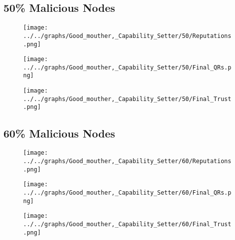 \begin{minipage}[t]{0.49\columnwidth}
\subsection*{50\% Malicious Nodes}
    \begin{figure}[H]
        \centering
        \texttt{[image: ../../graphs/Good\_mouther,\_Capability\_Setter/50/Reputations.png]}
    \end{figure}
    \begin{figure}[H]
        \centering
        \texttt{[image: ../../graphs/Good\_mouther,\_Capability\_Setter/50/Final\_QRs.png]}
    \end{figure}
\end{minipage}
\begin{minipage}[t]{0.49\columnwidth}
    \begin{figure}[H]
        \centering
        \texttt{[image: ../../graphs/Good\_mouther,\_Capability\_Setter/50/Final\_Trust.png]}
    \end{figure}
\end{minipage}

\begin{minipage}[t]{0.49\columnwidth}
\subsection*{60\% Malicious Nodes}
    \begin{figure}[H]
        \centering
        \texttt{[image: ../../graphs/Good\_mouther,\_Capability\_Setter/60/Reputations.png]}
    \end{figure}
    \begin{figure}[H]
        \centering
        \texttt{[image: ../../graphs/Good\_mouther,\_Capability\_Setter/60/Final\_QRs.png]}
    \end{figure}
\end{minipage}
\begin{minipage}[t]{0.49\columnwidth}
    \begin{figure}[H]
        \centering
        \texttt{[image: ../../graphs/Good\_mouther,\_Capability\_Setter/60/Final\_Trust.png]}
    \end{figure}
\end{minipage}

